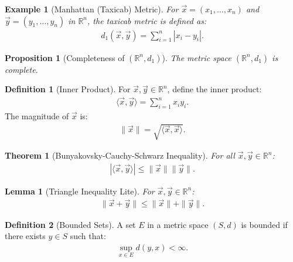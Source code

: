 \documentclass[7pt]{article}
\theoremstyle{definition}
\newtheorem{definition}{Definition}
\theoremstyle{plain}
\newtheorem{theorem}{Theorem}
\newtheorem{proposition}{Proposition}
\newtheorem{example}{Example}
\newtheorem{lemma}{Lemma}
\begin{document}
\begin{example}[Manhattan (Taxicab) Metric]
For $ \vec{x} = (x_1, \ldots, x_n) $ and $ \vec{y} = (y_1, \ldots, y_n) $ in $ \mathbb{R}^n $, the taxicab metric is defined as:
\begin{align}
d_1(\vec{x}, \vec{y}) = \sum_{i=1}^n |x_i - y_i|.
\end{align}
\end{example}

\begin{proposition}[Completeness of $ (\mathbb{R}^n, d_1) $]
The metric space $ (\mathbb{R}^n, d_1) $ is complete.
\end{proposition}

\begin{definition}[Inner Product]
For $ \vec{x}, \vec{y} \in \mathbb{R}^n $, define the inner product:
\begin{align}
\langle \vec{x}, \vec{y} \rangle = \sum_{i=1}^n x_i y_i.
\end{align}
The magnitude of $ \vec{x} $ is:
\begin{align}
\|\vec{x}\| = \sqrt{\langle \vec{x}, \vec{x} \rangle}.
\end{align}
\end{definition}

\begin{theorem}[Bunyakovsky-Cauchy-Schwarz Inequality]
For all $ \vec{x}, \vec{y} \in \mathbb{R}^n $:
\begin{align}
|\langle \vec{x}, \vec{y} \rangle| \leq \|\vec{x}\| \|\vec{y}\|.
\end{align}
\end{theorem}

\begin{lemma}[Triangle Inequality Lite]
For $ \vec{x}, \vec{y} \in \mathbb{R}^n $:
\begin{align}
\|\vec{x} + \vec{y}\| \leq \|\vec{x}\| + \|\vec{y}\|.
\end{align}
\end{lemma}

\begin{definition}[Bounded Sets]
A set $ E $ in a metric space $ (S, d) $ is bounded if there exists $ y \in S $ such that:
\begin{align}
\sup_{x \in E} d(y, x) < \infty.
\end{align}
\end{definition}
\end{document}
